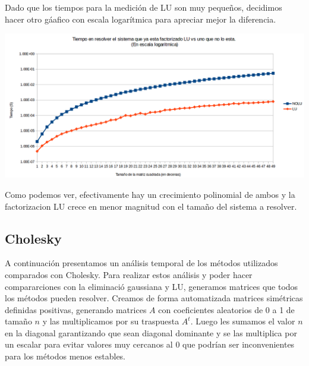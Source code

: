 Dado que los tiempos para la medición de LU son muy pequeños, decidimos hacer otro gáafico con escala logarítmica para apreciar mejor la diferencia.


{\centering
    \includegraphics[scale=0.6]{informe/imagenes/LUVSNOLUDIMLOG.PNG} \\
}

Como podemos ver, efectivamente hay un crecimiento polinomial de ambos y la factorizacion LU crece en menor magnitud con el tamaño del sistema a resolver.


\subsection{Cholesky}

A continuación presentamos un análisis temporal de los métodos utilizados comparados con Cholesky. Para realizar estos análisis y poder hacer compararciones con la eliminació gaussiana y LU, generamos matrices que todos los métodos pueden resolver. Creamos de forma automatizada matrices simétricas definidas positivas, generando matrices $A$ con coeficientes aleatorios de 0 a 1 de tamaño $n$ y las multiplicamos por su traspuesta $A^{t}$. Luego les sumamos el valor $n$ en la diagonal garantizando que sean diagonal dominante y se las multiplica por un escalar para evitar valores muy cercanos al 0 que podrían ser inconvenientes para los métodos menos estables. \\


